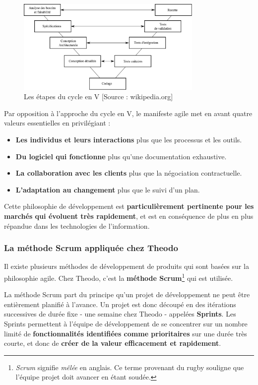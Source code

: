 \begin{figure}[!ht]
    \center
    \includegraphics[width=0.8\textwidth]{./images/I_1_cycle_V.png}
    \caption{Les étapes du cycle en V [Source : wikipedia.org]}
\end{figure}

Par opposition à l'approche du cycle en V, le manifeste agile met en avant quatre valeurs essentielles en privilégiant :
\begin{itemize}
\item \textbf{Les individus et leurs interactions} plus que les processus et les outils.
\item \textbf{Du logiciel qui fonctionne} plus qu’une documentation exhaustive.
\item \textbf{La collaboration avec les clients} plus que la négociation contractuelle.
\item \textbf{L’adaptation au changement} plus que le suivi d’un plan.
\end{itemize}

Cette philosophie de développement est \textbf{particulièrement pertinente pour les marchés qui évoluent très rapidement}, et est en conséquence de plus en plus répandue dans les technologies de l'information.

\subsubsection*{La méthode Scrum appliquée chez Theodo}

Il existe plusieurs méthodes de développement de produits qui sont basées sur la philosophie agile. Chez Theodo, c'est la \textbf{méthode Scrum}\footnote{\textit{Scrum} signifie \textit{mêlée} en anglais. Ce terme provenant du rugby souligne que l'équipe projet doit avancer en étant soudée.} qui est utilisée.

La méthode Scrum part du principe qu'un projet de développement ne peut être entièrement planifié à l'avance. Un projet est donc découpé en des itérations successives de durée fixe - une semaine chez Theodo - appelées \textbf{Sprints}. Les Sprints permettent à l'équipe de développement de se concentrer sur un nombre limité de \textbf{fonctionnalités identifiées comme prioritaires} sur une durée très courte, et donc de \textbf{créer de la valeur efficacement et rapidement}.

